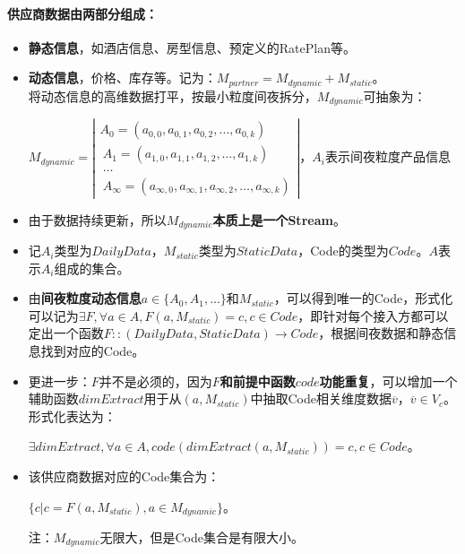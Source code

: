 \documentclass[a4paper]{article}
\begin{document}
\paragraph{供应商数据由两部分组成：}
\begin{itemize}
    \item \textbf{静态信息}，如酒店信息、房型信息、预定义的RatePlan等。
    \item \textbf{动态信息}，价格、库存等。记为：$M_{partner}=M_{dynamic}+M_{static}$。\\
    将动态信息的高维数据打平，按最小粒度间夜拆分，$M_{dynamic}$可抽象为：
    \begin{center}
        $M_{dynamic}=\left|\begin{array}{ccc}
            A_0=(a_{0,0},a_{0,1},a_{0,2}, \dots, a_{0,k}) \\\
            A_1=(a_{1,0},a_{1,1},a_{1,2}, \dots, a_{1,k}) \\\
            \dots \\\
            A_{\infty}=(a_{\infty,0},a_{\infty,1},a_{\infty,2},\dots,a_{\infty,k}) 
        \end{array} \right|$，$A_i$表示间夜粒度产品信息
    \end{center}
    \item 由于数据持续更新，所以\textbf{$M_{dynamic}$本质上是一个Stream}。
    \item 记$A_i$类型为$DailyData$，$M_{static}$类型为$StaticData$，Code的类型为$Code$。$A$表示$A_i$组成的集合。
    \item 由\textbf{间夜粒度动态信息}$a\in \{A_0,A_1,...\}$和$M_{static}$，可以得到唯一的Code，形式化可以记为$\exists F,  \forall a \in A, F(a,M_{static}) = c ,  c\in Code$，即针对每个接入方都可以定出一个函数$F::(DailyData, StaticData) \to Code$，根据间夜数据和静态信息找到对应的Code。
    \item 更进一步：$F$并不是必须的，因为\textbf{$F$和前提中函数$code$功能重复}，可以增加一个辅助函数$dimExtract$用于从$(a, M_{static})$中抽取Code相关维度数据$\overline v，\overline v \in V_c$。形式化表达为：
    \begin{center}
        $\exists dimExtract,  \forall a \in A, code(dimExtract(a,M_{static})) = c ,  c\in Code$。
    \end{center}
    \item 该供应商数据对应的Code集合为：
    \begin{center}
        $\{ c | c = F(a, M_{static}), a \in M_{dynamic}\}$。
    \end{center}
    注：$M_{dynamic}$无限大，但是Code集合是有限大小。
\end{itemize}
\end{document}
